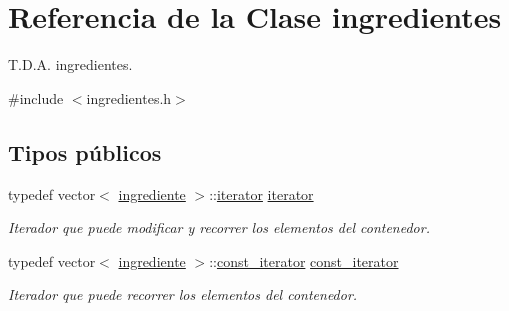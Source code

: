\hypertarget{classingredientes}{}\section{Referencia de la Clase ingredientes}
\label{classingredientes}


T.\+D.\+A. ingredientes.  




{\ttfamily \#include $<$ingredientes.\+h$>$}

\subsection*{Tipos públicos}
\begin{DoxyCompactItemize}
\item 
typedef vector$<$ \hyperlink{classingrediente}{ingrediente} $>$\+::\hyperlink{classingredientes_af0cadce160cefe5482ca7d55ef86c893}{iterator} \hyperlink{classingredientes_af0cadce160cefe5482ca7d55ef86c893}{iterator}
\begin{DoxyCompactList}\small\item\em Iterador que puede modificar y recorrer los elementos del contenedor. \end{DoxyCompactList}\item 
typedef vector$<$ \hyperlink{classingrediente}{ingrediente} $>$\+::\hyperlink{classingredientes_ac84040efbb789929ebe9177605bb890a}{const\+\_\+iterator} \hyperlink{classingredientes_ac84040efbb789929ebe9177605bb890a}{const\+\_\+iterator}
\begin{DoxyCompactList}\small\item\em Iterador que puede recorrer los elementos del contenedor. \end{DoxyCompactList}\end{DoxyCompactItemize}
